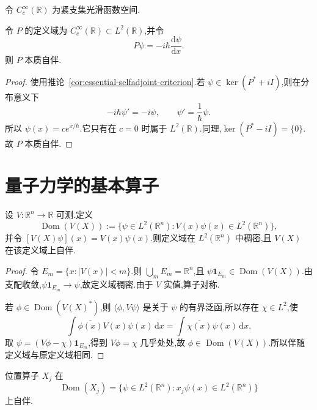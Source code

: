 令 \(C_{c}^{\infty}(\mathbb{R})\) 为紧支集光滑函数空间.

\begin{proposition}[实轴上的动量算子]\label{prop:momentum-essential-selfadjoint}
令 \(P\) 的定义域为 \(C_{c}^{\infty}(\mathbb{R})\subset L^{2}(\mathbb{R})\),并令
\[
P\psi=-i\hbar\frac{\mathrm{d}\psi}{\mathrm{d}x}.
\]
则 \(P\) 本质自伴.
\end{proposition}

\begin{proof}
使用推论~\ref{cor:essential-selfadjoint-criterion}.若 \(\psi\in\ker(P^{*}+iI)\),则在分布意义下
\[
-i\hbar\psi'=-i\psi,
\qquad \psi'=\frac{1}{\hbar}\psi.
\]
所以 \(\psi(x)=ce^{x/\hbar}\).它只有在 \(c=0\) 时属于 \(L^{2}(\mathbb{R})\).同理,\(\ker(P^{*}-iI)=\{0\}\).故 \(P\) 本质自伴.
\end{proof}

\section{量子力学的基本算子}
\label{sec:basic-unbounded-operators}

\begin{proposition}[势能乘法算子]\label{prop:unbounded-potential-selfadjoint}
设 \(V:\mathbb{R}^{n}\to\mathbb{R}\) 可测.定义
\[
\operatorname{Dom}(V(X)):=\{\psi\in L^{2}(\mathbb{R}^{n}):V(x)\psi(x)\in L^{2}(\mathbb{R}^{n})\},
\]
并令 \([V(X)\psi](x)=V(x)\psi(x)\).则定义域在 \(L^{2}(\mathbb{R}^{n})\) 中稠密,且 \(V(X)\) 在该定义域上自伴.
\end{proposition}

\begin{proof}
令 \(E_{m}=\{x:|V(x)|<m\}\).则 \(\bigcup_{m}E_{m}=\mathbb{R}^{n}\),且 \(\psi\mathbf{1}_{E_{m}}\in\operatorname{Dom}(V(X))\).由支配收敛,\(\psi\mathbf{1}_{E_{m}}\to\psi\),故定义域稠密.由于 \(V\) 实值,算子对称.

若 \(\phi\in\operatorname{Dom}(V(X)^{*})\),则 \(\langle\phi,V\psi\rangle\) 是关于 \(\psi\) 的有界泛函,所以存在 \(\chi\in L^{2}\),使
\[
\int\overline{\phi(x)}V(x)\psi(x)\,\mathrm{d}x
=\int\overline{\chi(x)}\psi(x)\,\mathrm{d}x.
\]
取 \(\psi=(V\phi-\chi)\mathbf{1}_{E_{m}}\),得到 \(V\phi=\chi\) 几乎处处,故 \(\phi\in\operatorname{Dom}(V(X))\).所以伴随定义域与原定义域相同.
\end{proof}

\begin{corollary}[位置算子的自伴性]\label{cor:position-selfadjoint}
位置算子 \(X_{j}\) 在
\[
\operatorname{Dom}(X_{j})=\{\psi\in L^{2}(\mathbb{R}^{n}):x_{j}\psi(x)\in L^{2}(\mathbb{R}^{n})\}
\]
上自伴.
\end{corollary}

